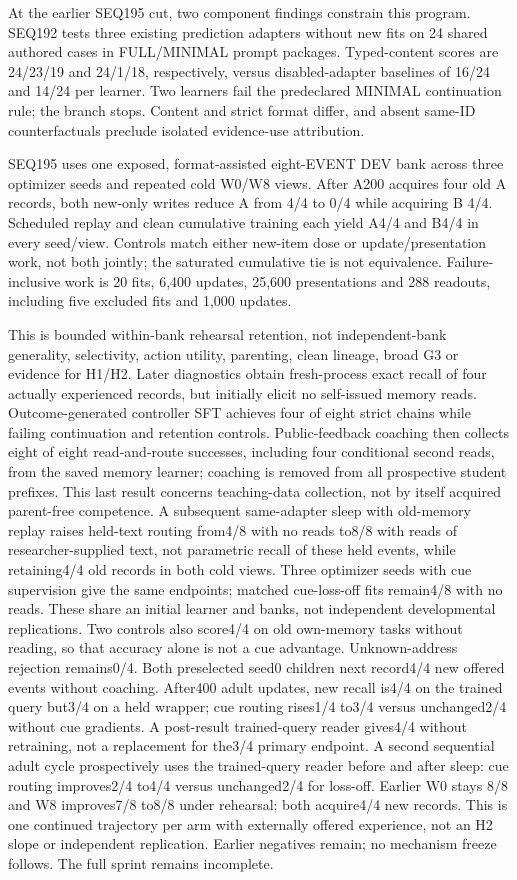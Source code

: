 \documentclass{article}
\begin{document}
At the earlier SEQ195 cut, two component findings constrain this program. SEQ192 tests
three existing prediction adapters without new fits on 24 shared authored
cases in FULL/MINIMAL prompt packages. Typed-content scores are 24/23/19 and
24/1/18, respectively, versus disabled-adapter baselines of 16/24 and 14/24
per learner. Two learners fail the predeclared MINIMAL continuation rule; the
branch stops. Content and strict format differ, and absent same-ID
counterfactuals preclude isolated evidence-use attribution.

SEQ195 uses one exposed, format-assisted eight-EVENT DEV bank across three
optimizer seeds and repeated cold W0/W8 views. After A200 acquires four old A
records, both new-only writes reduce A from 4/4 to 0/4 while acquiring B 4/4.
Scheduled replay and clean cumulative training each yield A4/4 and B4/4 in
every seed/view. Controls match either new-item dose or update/presentation
work, not both jointly; the saturated cumulative tie is not equivalence.
Failure-inclusive work is 20 fits, 6,400 updates, 25,600 presentations and 288
readouts, including five excluded fits and 1,000 updates.

This is bounded within-bank rehearsal retention, not independent-bank
generality, selectivity, action utility, parenting, clean lineage, broad G3 or
evidence for H1/H2. Later diagnostics obtain fresh-process exact recall of four
actually experienced records, but initially elicit no self-issued memory reads.
Outcome-generated controller SFT achieves four of eight strict chains while
failing continuation and retention controls. Public-feedback coaching then
collects eight of eight read-and-route successes, including four conditional
second reads, from the saved memory learner; coaching is removed from all
prospective student prefixes. This last result concerns teaching-data collection,
not by itself acquired parent-free competence. A subsequent same-adapter sleep
with old-memory replay raises held-text routing from4/8 with no reads to8/8
with reads of researcher-supplied text, not parametric recall of these held
events, while retaining4/4 old records in both cold views. Three optimizer
seeds with cue supervision give the same endpoints; matched cue-loss-off fits
remain4/8 with no reads. These share an initial learner and banks, not independent
developmental replications. Two controls also score4/4 on old own-memory tasks
without reading, so that accuracy alone is not a cue advantage. Unknown-address
rejection remains0/4. Both preselected seed0 children next record4/4 new offered
events without coaching. After400 adult updates, new recall is4/4 on the trained
query but3/4 on a held wrapper; cue routing rises1/4 to3/4 versus unchanged2/4
without cue gradients. A post-result trained-query reader gives4/4 without
retraining, not a replacement for the3/4 primary endpoint. A second sequential
adult cycle prospectively uses the trained-query reader before and after sleep:
cue routing improves2/4 to4/4 versus unchanged2/4 for loss-off. Earlier W0 stays
8/8 and W8 improves7/8 to8/8 under rehearsal; both acquire4/4 new records.
This is one continued trajectory
per arm with externally offered experience, not an H2 slope or independent
replication. Earlier negatives
remain; no mechanism freeze follows. The full sprint remains incomplete.
\end{document}
